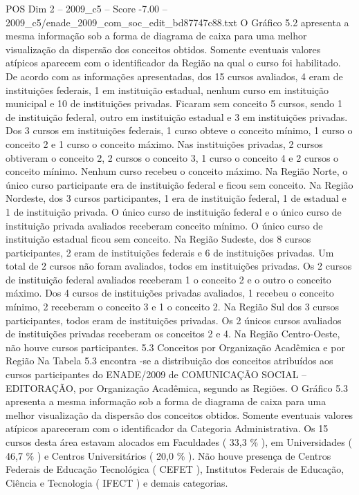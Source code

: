 \begin{textsample}{POS Dim 2 – 2009\_c5 – Score -7.00 – 2009\_c5/enade\_2009\_com\_soc\_edit\_bd87747c88.txt}
O Gráfico 5.2 apresenta a mesma informação sob a forma de diagrama de caixa para uma melhor visualização da dispersão dos conceitos obtidos.
Somente eventuais valores atípicos aparecem com o identificador da Região na qual o curso foi habilitado.
De acordo com as informações apresentadas, dos 15 cursos avaliados, 4 eram de instituições federais, 1 em instituição estadual, nenhum curso em instituição municipal e 10 de instituições privadas.
Ficaram sem conceito 5 cursos, sendo 1 de instituição federal, outro em instituição estadual e 3 em instituições privadas.
Dos 3 cursos em instituições federais, 1 curso obteve o conceito mínimo, 1 curso o conceito 2 e 1 curso o conceito máximo.
Nas instituições privadas, 2 cursos obtiveram o conceito 2, 2 cursos o conceito 3, 1 curso o conceito 4 e 2 cursos o conceito mínimo.
Nenhum curso recebeu o conceito máximo.
Na Região Norte, o único curso participante era de instituição federal e ficou sem conceito.
Na Região Nordeste, dos 3 cursos participantes, 1 era de instituição federal, 1 de estadual e 1 de instituição privada.
O único curso de instituição federal e o único curso de instituição privada avaliados receberam conceito mínimo.
O único curso de instituição estadual ficou sem conceito.
Na Região Sudeste, dos 8 cursos participantes, 2 eram de instituições federais e 6 de instituições privadas.
Um total de 2 cursos não foram avaliados, todos em instituições privadas.
Os 2 cursos de instituição federal avaliados receberam 1 o conceito 2 e o outro o conceito máximo.
Dos 4 cursos de instituições privadas avaliados, 1 recebeu o conceito mínimo, 2 receberam o conceito 3 e 1 o conceito 2.
Na Região Sul dos 3 cursos participantes, todos eram de instituições privadas.
Os 2 únicos cursos avaliados de instituições privadas receberam os conceitos 2 e 4.
Na Região Centro-Oeste, não houve cursos participantes. 5.3 Conceitos por Organização Acadêmica e por Região Na Tabela 5.3 encontra -se a distribuição dos conceitos atribuídos aos cursos participantes do ENADE/2009 de COMUNICAÇÃO SOCIAL – EDITORAÇÃO, por Organização Acadêmica, segundo as Regiões.
O Gráfico 5.3 apresenta a mesma informação sob a forma de diagrama de caixa para uma melhor visualização da dispersão dos conceitos obtidos.
Somente eventuais valores atípicos apareceram com o identificador da Categoria Administrativa.
Os 15 cursos desta área estavam alocados em Faculdades ( 33,3 \% ), em Universidades ( 46,7 \% ) e Centros Universitários ( 20,0 \% ).
Não houve presença de Centros Federais de Educação Tecnológica ( CEFET ), Institutos Federais de Educação, Ciência e Tecnologia ( IFECT ) e demais categorias.

\end{textsample}

